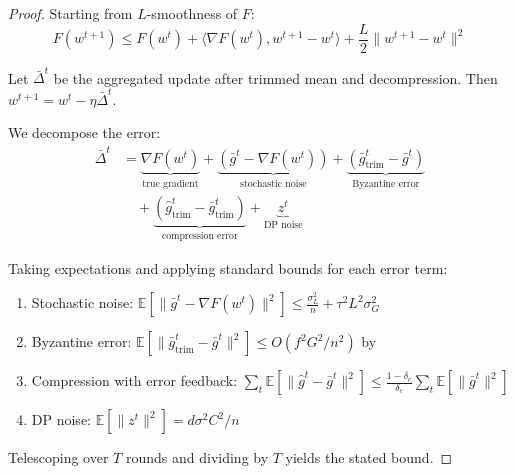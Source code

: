 \documentclass[11pt,a4paper]{article}
\newcommand{\EE}{\mathbb{E}}
\begin{document}
\begin{proof}
Starting from $L$-smoothness of $F$:
\begin{equation}
    F(w^{t+1}) \leq F(w^t) + \langle \nabla F(w^t), w^{t+1} - w^t \rangle + \frac{L}{2} \|w^{t+1} - w^t\|^2
\end{equation}

Let $\bar{\Delta}^t$ be the aggregated update after trimmed mean and decompression. Then $w^{t+1} = w^t - \eta \bar{\Delta}^t$.

We decompose the error:
\begin{align}
    \bar{\Delta}^t &= \underbrace{\nabla F(w^t)}_{\text{true gradient}} + \underbrace{(\bar{g}^t - \nabla F(w^t))}_{\text{stochastic noise}} + \underbrace{(\bar{g}_{\text{trim}}^t - \bar{g}^t)}_{\text{Byzantine error}} \\
    &\quad + \underbrace{(\hat{g}_{\text{trim}}^t - \bar{g}_{\text{trim}}^t)}_{\text{compression error}} + \underbrace{z^t}_{\text{DP noise}}
\end{align}

Taking expectations and applying standard bounds for each error term:

\begin{enumerate}
    \item Stochastic noise: $\EE[\|\bar{g}^t - \nabla F(w^t)\|^2] \leq \frac{\sigma_L^2}{n} + \tau^2 L^2 \sigma_G^2$
    \item Byzantine error: $\EE[\|\bar{g}_{\text{trim}}^t - \bar{g}^t\|^2] \leq O(f^2 G^2 / n^2)$ by~\citep{yin2018byzantine}
    \item Compression with error feedback: $\sum_t \EE[\|\hat{g}^t - \bar{g}^t\|^2] \leq \frac{1-\delta_c}{\delta_c} \sum_t \EE[\|\bar{g}^t\|^2]$
    \item DP noise: $\EE[\|z^t\|^2] = d \sigma^2 C^2 / n$
\end{enumerate}

Telescoping over $T$ rounds and dividing by $T$ yields the stated bound.
\end{proof}
\end{document}
